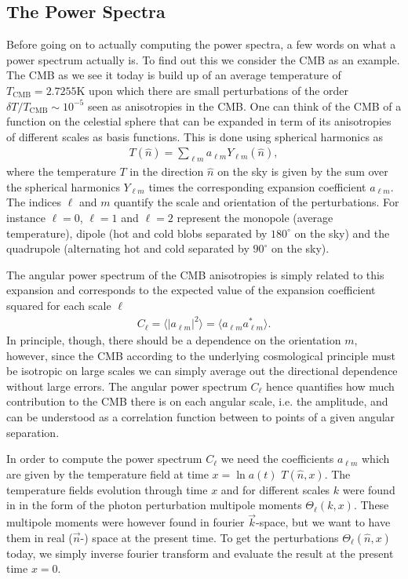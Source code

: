 \documentclass[twocolumn]{aastex62}
\begin{document}
\subsection{The Power Spectra} \label{subsec:spectra}
Before going on to actually computing the power spectra, a few words on what a power spectrum actually is. To find out this we consider the CMB as an example. The CMB as we see it today is build up of an average temperature of $T_\mathrm{CMB} = 2.7255\mathrm{K}$ upon which there are small perturbations of the order $\delta T / T_\mathrm{CMB} \sim 10^{-5}$ seen as anisotropies in the CMB. One can think of the CMB of a function on the celestial sphere that can be expanded in term of its anisotropies of different scales as basis functions. This is done using spherical harmonics as 
\begin{align}
    T(\hat{n}) = \sum_{\ell m} a_{\ell m} Y_{\ell m}(\hat{n}),
\end{align}
where the temperature $T$ in the direction $\hat{n}$ on the sky is given by the sum over the spherical harmonics $Y_{\ell m}$ times the corresponding expansion coefficient $a_{\ell m}$. The indices $\ell$ and $m$ quantify the scale and orientation of the perturbations. For instance $\ell = 0$, $\ell = 1$ and $\ell = 2$ represent the monopole (average temperature), dipole (hot and cold blobs separated by $180^\circ$ on the sky) and the quadrupole (alternating hot and cold separated by $90^\circ$ on the sky).

The angular power spectrum of the CMB anisotropies is simply related to this expansion and corresponds to the expected value of the expansion coefficient squared for each scale $\ell$
\begin{align}
    C_\ell = \langle |a_{\ell m}|^2 \rangle = \langle a_{\ell m}a_{\ell m}^* \rangle.
\end{align}
In principle, though, there should be a dependence on the orientation $m$, however, since the CMB according to the underlying cosmological principle must be isotropic on large scales we can simply average out the directional dependence without large errors. The angular power spectrum $C_\ell$ hence quantifies how much contribution to the CMB there is on each angular scale, i.e. the amplitude, and can be understood as a correlation function between to points of a given angular separation. 

In order to compute the power spectrum $C_\ell$ we need the coefficients $a_{\ell m}$ which are given by the temperature field at time $x = \ln a(t)$ $T(\hat{n}, x)$. The temperature fields evolution through time $x$ and for different scales $k$ were found in \cite{stutzer:2020c} in the form of the photon perturbation multipole moments $\Theta_\ell(k, x)$. These multipole moments were however found in fourier $\vec{k}$-space, but we want to have them in real ($\vec{n}$-) space at the present time. To get the perturbations $\Theta_\ell(\hat{n}, x)$ today, we simply inverse fourier transform and evaluate the result at the present time $x = 0$. 
\end{document}
